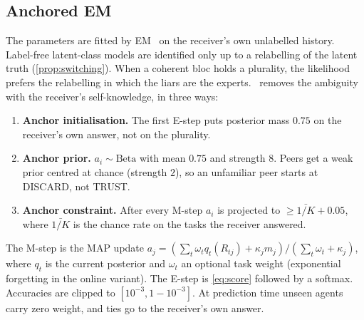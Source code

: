 \subsection{Anchored EM}
The parameters are fitted by EM~\citep{dempster1977} on the receiver's own unlabelled history. Label-free latent-class models are identified only up to a relabelling of the latent truth (\cref{prop:switching}). When a coherent bloc holds a plurality, the likelihood prefers the relabelling in which the liars are the experts. \race\ removes the ambiguity with the receiver's self-knowledge, in three ways:
\begin{enumerate}
\item \textbf{Anchor initialisation.} The first E-step puts posterior mass $0.75$ on the receiver's own answer, not on the plurality.
\item \textbf{Anchor prior.} $a_i\sim\mathrm{Beta}$ with mean $0.75$ and strength $8$. Peers get a weak prior centred at chance (strength $2$), so an unfamiliar peer starts at DISCARD, not TRUST.
\item \textbf{Anchor constraint.} After every M-step $a_i$ is projected to $\ge \bar{1/K}+0.05$, where $\bar{1/K}$ is the chance rate on the tasks the receiver answered.
\end{enumerate}
The M-step is the MAP update $a_j=(\sum_t \omega_t q_t(R_{tj}) + \kappa_j m_j)/(\sum_t \omega_t + \kappa_j)$, where $q_t$ is the current posterior and $\omega_t$ an optional task weight (exponential forgetting in the online variant). The E-step is \cref{eq:score} followed by a softmax. Accuracies are clipped to $[10^{-3},1-10^{-3}]$. At prediction time unseen agents carry zero weight, and ties go to the receiver's own answer.


